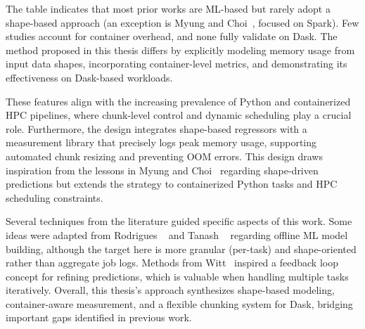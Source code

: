 The table indicates that most prior works are \ac{ML}-based but rarely adopt a shape-based approach (an exception is Myung and Choi~\cite{myung2021}, focused on Spark).
Few studies account for container overhead, and none fully validate on Dask.
The method proposed in this thesis differs by explicitly modeling memory usage from input data shapes, incorporating container-level metrics, and demonstrating its effectiveness on Dask-based workloads.

These features align with the increasing prevalence of Python and containerized \ac{HPC} pipelines, where chunk-level control and dynamic scheduling play a crucial role.
Furthermore, the design integrates shape-based regressors with a measurement library that precisely logs peak memory usage, supporting automated chunk resizing and preventing \ac{OOM} errors.
This design draws inspiration from the lessons in Myung and Choi~\cite{myung2021} regarding shape-driven predictions but extends the strategy to containerized Python tasks and HPC scheduling constraints.

Several techniques from the literature guided specific aspects of this work.
Some ideas were adapted from Rodrigues \etal~\cite{rodrigues2016} and Tanash \etal~\cite{tanash2021ampro} regarding offline ML model building, although the target here is more granular (per-task) and shape-oriented rather than aggregate job logs.
Methods from Witt~\cite{witt2020} inspired a feedback loop concept for refining predictions, which is valuable when handling multiple tasks iteratively.
Overall, this thesis's approach synthesizes shape-based modeling, container-aware measurement, and a flexible chunking system for Dask, bridging important gaps identified in previous work.